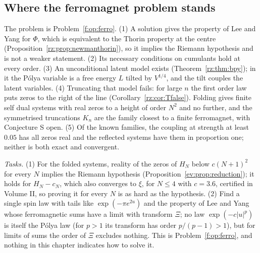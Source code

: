 \subsection{Where the ferromagnet problem stands}\label{lxi:sub:stands}

The problem is Problem~\ref{f:op:ferro}. (1) A solution gives the property of Lee and Yang for $\Phi$, which is equivalent to the Thorin property at the centre (Proposition~\ref{rz:prop:newmanthorin}), so it implies the Riemann hypothesis and is not a weaker statement. (2) Its necessary conditions on cumulants hold at every order. (3) An unconditional latent model exists (Theorem~\ref{rz:thm:bpy}); in it the P\'olya variable is a free energy $L$ tilted by $V^{1/4}$, and the tilt couples the latent variables. (4) Truncating that model fails: for large $n$ the first order law puts zeros to the right of the line (Corollary~\ref{rz:cor:Tfalse}). Folding gives finite self dual systems with real zeros to a height of order $N^2$ and no further, and the symmetrised truncations $K_n$ are the family closest to a finite ferromagnet, with Conjecture S open. (5) Of the known families, the coupling at strength at least $0.05$ has all zeros real and the reflected systems have them in proportion one; neither is both exact and convergent.

\emph{Tasks.} (1) For the folded systems, reality of the zeros of $H_N$ below $c(N+1)^2$ for every $N$ implies the Riemann hypothesis (Proposition~\ref{ev:prop:reduction}); it holds for $H_N-c_N$, which also converges to $\xi$, for $N\le4$ with $c=3.6$, certified in Volume II, so proving it for every $N$ is as hard as the hypothesis. (2) Find a single spin law with tails like $\exp(-\pi e^{2u})$ and the property of Lee and Yang whose ferromagnetic sums have a limit with transform $\Xi$; no law $\exp(-c|u|^p)$ is itself the P\'olya law (for $p>1$ its transform has order $p/(p-1)>1$), but for limits of sums the order of $\Xi$ excludes nothing. This is Problem~\ref{f:op:ferro}, and nothing in this chapter indicates how to solve it.
